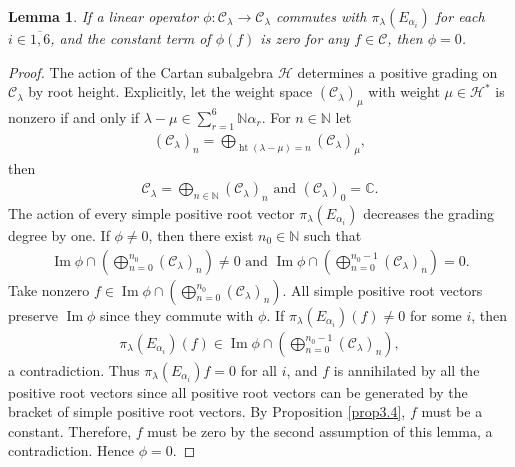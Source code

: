 \documentclass[12pt]{article}
\numberwithin{equation}{section}
\newtheorem{lemma}[theorem]{Lemma}
\theoremstyle{definition}
\theoremstyle{remark}
\begin{document}
\begin{lemma}\label{lem3.8}
	If a linear operator $\phi:\mathscr{C}_{\lambda}\longrightarrow\mathscr{C}_{\lambda}$ commutes with $\pi_{\lambda}(E_{\alpha_i})$ for each $i\in\overline{1,6}$, and the constant term of $\phi(f)$ is zero for any $f\in\mathscr{C}$, then $\phi=0$.
\end{lemma}
\begin{proof}
	The action of the Cartan subalgebra $\mathscr{H}$ determines a positive grading on $\mathscr{C}_{\lambda}$ by root height. Explicitly, let the weight space $(\mathscr{C}_{\lambda})_{\mu}$ with weight $\mu\in\mathscr{H}^{*}$ is nonzero if and only if $\lambda-\mu\in\sum_{r=1}^{6}\mathbb{N}\alpha_r$. For $n\in\mathbb{N}$ let
	\begin{align}
		(\mathscr{C}_{\lambda})_n=\bigoplus_{\operatorname{ht}(\lambda-\mu)=n}(\mathscr{C}_{\lambda})_\mu,
	\end{align}
	then
	\begin{align}
		\mathscr{C}_{\lambda}=\bigoplus_{n\in\mathbb{N}}(\mathscr{C}_{\lambda})_n\text{ and }(\mathscr{C}_{\lambda})_0=\mathbb{C}.
	\end{align}
	The action of every simple positive root vector $\pi_{\lambda}(E_{\alpha_i})$ decreases the grading degree by one. 
	If $\phi\neq0$, then there exist $n_0\in\mathbb{N}$ such that
	\begin{eqnarray}
		\operatorname{Im}\phi\cap (\bigoplus_{n=0}^{n_0}(\mathscr{C}_{\lambda})_n)\neq0\text{ and }\operatorname{Im}\phi\cap (\bigoplus_{n=0}^{n_0-1}(\mathscr{C}_{\lambda})_n)=0.
	\end{eqnarray}
	Take nonzero $f\in\operatorname{Im}\phi\cap (\bigoplus_{n=0}^{n_0}(\mathscr{C}_{\lambda})_n)$.
	All simple positive root vectors preserve $\operatorname{Im}\phi$ since they commute with $\phi$. If $\pi_{\lambda}(E_{\alpha_i})(f)\neq 0$ for some $i$, then 
	\begin{align}
		\pi_{\lambda}(E_{\alpha_i})(f)\in\operatorname{Im}\phi\cap (\bigoplus_{n=0}^{n_0-1}(\mathscr{C}_{\lambda})_n),
	\end{align}
	a contradiction. Thus $\pi_{\lambda}(E_{\alpha_i})f=0$ for all $i$, and $f$ is annihilated by all the positive root vectors since all positive root vectors can be generated by the bracket of simple positive root vectors. By Proposition \ref{prop3.4}, $f$ must be a constant. Therefore, $f$ must be zero by the second assumption of this lemma, a contradiction. Hence $\phi=0$.
\end{proof}
\end{document}
